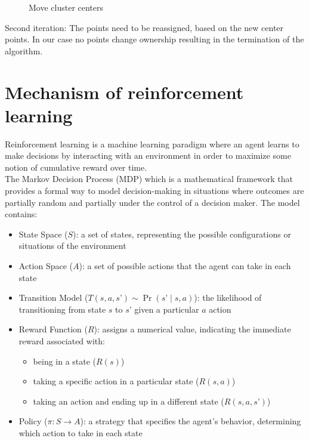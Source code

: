 \documentclass[a4paper,12pt,answers]{article}
\begin{document}
	\begin{figure}[H]
		\centering
		
		\caption{Move cluster centers}
	\end{figure}
	\noindent
	Second iteration: The points need to be reassigned, based on the new center points. In our case no points change ownership resulting in the termination of the algorithm.
	
	
	
	\newpage
	\section{Mechanism of reinforcement learning}
	Reinforcement learning is a machine learning paradigm where an agent learns to make decisions by interacting with an environment in order to maximize some notion of cumulative reward over time.
	\\[8pt]
	\noindent
	The Markov Decision Process (MDP) which is a mathematical framework that provides a formal way to model decision-making in situations where outcomes are partially random and partially under the control of a decision maker.
	The model contains:
	\begin{itemize}
		\item State Space ($S$): a set of states, representing the possible configurations or situations of the environment
		\item Action Space ($A$): a set of possible actions that the agent can take in each state
		\item Transition Model ($T{(s, a, s’)} \sim \Pr(s’\mid s, a)$): the likelihood of transitioning from state $s$ to $s’$ given a particular $a$ action 
		\item Reward Function ($R$): assigns a numerical value, indicating the immediate reward associated with:
		\begin{itemize}
			\item being in a state ($R(s)$)
			\item taking a specific action in a particular state ($R(s, a)$)
			\item taking an action and ending up in a different state ($R(s, a, s’)$)
		\end{itemize}
		\item Policy ($\pi: S \rightarrow A$): a strategy that specifies the agent's behavior, determining which action to take in each state
	\end{itemize}
\end{document}
